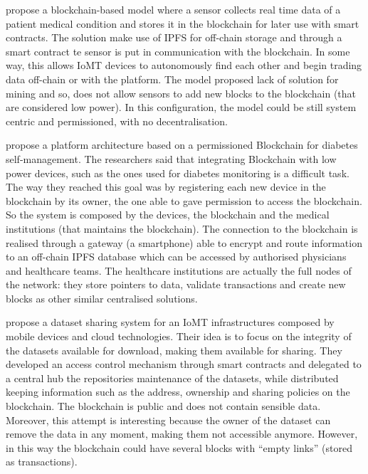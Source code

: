 \documentclass[preprint]{elsarticle}
\begin{document}
\citet{dey2017healthsense} propose a blockchain-based model where a sensor collects real time data of a patient medical condition and stores it in the blockchain for later use with smart contracts. The solution make use of IPFS for off-chain storage and through a smart contract te sensor is put in communication with the blockchain. In some way, this allows IoMT devices to autonomously find each other and begin trading data off-chain or with the platform. 
The model proposed lack of solution for mining and so, does not allow sensors to add new blocks to the blockchain (that are considered low power). In this configuration, the model could be still system centric and permissioned, with no decentralisation.
 	
\citet{azbeg2018blockchain} propose a platform architecture based on a permissioned Blockchain for diabetes self-management. The researchers said that integrating Blockchain with low power devices, such as the ones used for diabetes monitoring is a difficult task. 
The way they reached this goal was by registering each new device in the blockchain by its owner, the one able to gave permission to access the blockchain. So the system is composed by the devices, the blockchain and the medical institutions (that maintains the blockchain). 
The connection to the blockchain is realised through a gateway (a smartphone) able to encrypt and route information to an off-chain IPFS database which can be accessed by authorised physicians and healthcare teams. The healthcare institutions are actually the full nodes of the network: they store pointers to data, validate transactions and create new blocks as other similar centralised solutions.
 	
\citet{nguyen2019mobile} propose a dataset sharing system for an IoMT infrastructures composed by mobile devices and cloud technologies. Their idea is to focus on the integrity of the datasets available for download, making them available for sharing.  They developed an access control mechanism through smart contracts and delegated to a central hub the repositories maintenance of the datasets, while distributed keeping information such as the address, ownership and sharing policies on the blockchain. The blockchain is public and does not contain sensible data. Moreover, this attempt is interesting because the owner of the dataset can remove the data in any moment, making them not accessible anymore. However, in this way the blockchain could have several blocks with ``empty links'' (stored as transactions). %
 	
\end{document}
